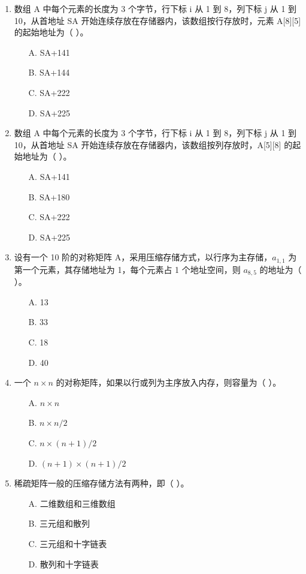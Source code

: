 \documentclass[12pt, a4paper]{article}
\begin{document}
\begin{enumerate}
    \item 数组 A 中每个元素的长度为 3 个字节，行下标 i 从 1 到 8，列下标 j 从 1 到 10，从首地址 SA 开始连续存放在存储器内，该数组按行存放时，元素 A[8][5] 的起始地址为（ ）。
    \begin{enumerate}
        \item[A.] SA+141
        \item[B.] SA+144
        \item[C.] SA+222
        \item[D.] SA+225
    \end{enumerate}
    
    \item 数组 A 中每个元素的长度为 3 个字节，行下标 i 从 1 到 8，列下标 j 从 1 到 10，从首地址 SA 开始连续存放在存储器内，该数组按列存放时，A[5][8] 的起始地址为（ ）。
    \begin{enumerate}
        \item[A.] SA+141
        \item[B.] SA+180
        \item[C.] SA+222
        \item[D.] SA+225
    \end{enumerate}
    
    \item 设有一个 10 阶的对称矩阵 A，采用压缩存储方式，以行序为主存储，$a_{1,1}$ 为第一个元素，其存储地址为 1，每个元素占 1 个地址空间，则 $a_{8,5}$ 的地址为（ ）。
    \begin{enumerate}
        \item[A.] 13
        \item[B.] 33
        \item[C.] 18
        \item[D.] 40
    \end{enumerate}
    
    \item 一个 $n \times n$ 的对称矩阵，如果以行或列为主序放入内存，则容量为（ ）。
    \begin{enumerate}
        \item[A.] $n \times n$
        \item[B.] $n \times n / 2$
        \item[C.] $n \times (n+1) / 2$
        \item[D.] $(n+1) \times (n+1) / 2$
    \end{enumerate}
    
    \item 稀疏矩阵一般的压缩存储方法有两种，即（ ）。
    \begin{enumerate}
        \item[A.] 二维数组和三维数组
        \item[B.] 三元组和散列
        \item[C.] 三元组和十字链表
        \item[D.] 散列和十字链表
    \end{enumerate}
    

\end{enumerate}
\end{document}
